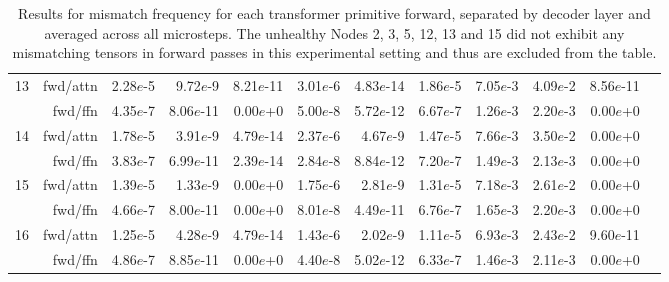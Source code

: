 \begin{table*}[t]
\begin{center}
\begin{tiny}
\begin{sc}
\begin{tabular}{rrrrrrrrrrrr}
\midrule
\multirow{2}{*}{13}      & fwd/attn         & 2.28$e$-5 & 9.72$e$-9  & 8.21$e$-11 & 3.01$e$-6 & 4.83$e$-14 & 1.86$e$-5 & 7.05$e$-3 & 4.09$e$-2 & 8.56$e$-11 \\
        & fwd/ffn          & 4.35$e$-7 & 8.06$e$-11 & 0.00$e$+0  & 5.00$e$-8 & 5.72$e$-12 & 6.67$e$-7 & 1.26$e$-3 & 2.20$e$-3 & 0.00$e$+0  \\
\midrule
\multirow{2}{*}{14}      & fwd/attn         & 1.78$e$-5 & 3.91$e$-9  & 4.79$e$-14 & 2.37$e$-6 & 4.67$e$-9  & 1.47$e$-5 & 7.66$e$-3 & 3.50$e$-2 & 0.00$e$+0  \\
        & fwd/ffn          & 3.83$e$-7 & 6.99$e$-11 & 2.39$e$-14 & 2.84$e$-8 & 8.84$e$-12 & 7.20$e$-7 & 1.49$e$-3 & 2.13$e$-3 & 0.00$e$+0  \\
\midrule
\multirow{2}{*}{15}       & fwd/attn         & 1.39$e$-5 & 1.33$e$-9  & 0.00$e$+0  & 1.75$e$-6 & 2.81$e$-9  & 1.31$e$-5 & 7.18$e$-3 & 2.61$e$-2 & 0.00$e$+0  \\
        & fwd/ffn          & 4.66$e$-7 & 8.00$e$-11 & 0.00$e$+0  & 8.01$e$-8 & 4.49$e$-11 & 6.76$e$-7 & 1.65$e$-3 & 2.20$e$-3 & 0.00$e$+0  \\
\midrule
\multirow{2}{*}{16}      & fwd/attn         & 1.25$e$-5 & 4.28$e$-9  & 4.79$e$-14 & 1.43$e$-6 & 2.02$e$-9  & 1.11$e$-5 & 6.93$e$-3 & 2.43$e$-2 & 9.60$e$-11 \\
        & fwd/ffn          & 4.86$e$-7 & 8.85$e$-11 & 0.00$e$+0  & 4.40$e$-8 & 5.02$e$-12 & 6.33$e$-7 & 1.46$e$-3 & 2.11$e$-3 & 0.00$e$+0 \\
\bottomrule
\end{tabular}

\end{sc}
\end{tiny}
\end{center}
\vskip 0.15in

\caption{Results for mismatch frequency for each transformer primitive forward, separated by decoder layer and averaged across all microsteps. The unhealthy Nodes 2, 3, 5, 12, 13 and 15 did not exhibit any mismatching tensors in forward passes in this experimental setting and thus are excluded from the table.}
\label{fig:forward_primitive_frequency}
\end{table*}
